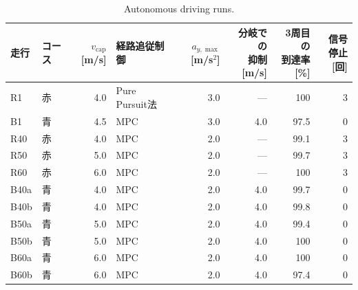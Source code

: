 \begin{table}[!htbp]
  \centering
  \caption{Autonomous driving runs.}
  \label{tab:runs}
  \small
  \begin{lrbox}{\tblbox}\setlength{\tabcolsep}{4pt}\begin{tabular}{llrlrrrr}
    \toprule
    走行 & コース & \shortstack[r]{$v_{\mathrm{cap}}$\\{[m/s]}} & 経路追従制御 & \shortstack[r]{$a_{y,\max}$\\{[m/s$^2$]}} & \shortstack[r]{分岐での\\抑制 {[m/s]}} & \shortstack[r]{3周目の\\到達率 {[\%]}} & \shortstack[r]{信号停止\\{[回]}} \\
    \midrule
    R1 & 赤 & 4.0 & Pure Pursuit法 & 3.0 & --- & 100 & 3 \\
    B1 & 青 & 4.5 & MPC & 3.0 & 4.0 & 97.5 & 0 \\
    \midrule
    R40 & 赤 & 4.0 & MPC & 2.0 & --- & 99.1 & 3 \\
    R50 & 赤 & 5.0 & MPC & 2.0 & --- & 99.7 & 3 \\
    R60 & 赤 & 6.0 & MPC & 2.0 & --- & 100 & 3 \\
    B40a & 青 & 4.0 & MPC & 2.0 & 4.0 & 99.7 & 0 \\
    B40b & 青 & 4.0 & MPC & 2.0 & 4.0 & 99.8 & 0 \\
    B50a & 青 & 5.0 & MPC & 2.0 & 4.0 & 99.4 & 0 \\
    B50b & 青 & 5.0 & MPC & 2.0 & 4.0 & 100 & 0 \\
    B60a & 青 & 6.0 & MPC & 2.0 & 4.0 & 100 & 0 \\
    B60b & 青 & 6.0 & MPC & 2.0 & 4.0 & 97.4 & 0 \\
    \bottomrule
  \end{tabular}\end{lrbox}\usebox{\tblbox}
\end{table}

